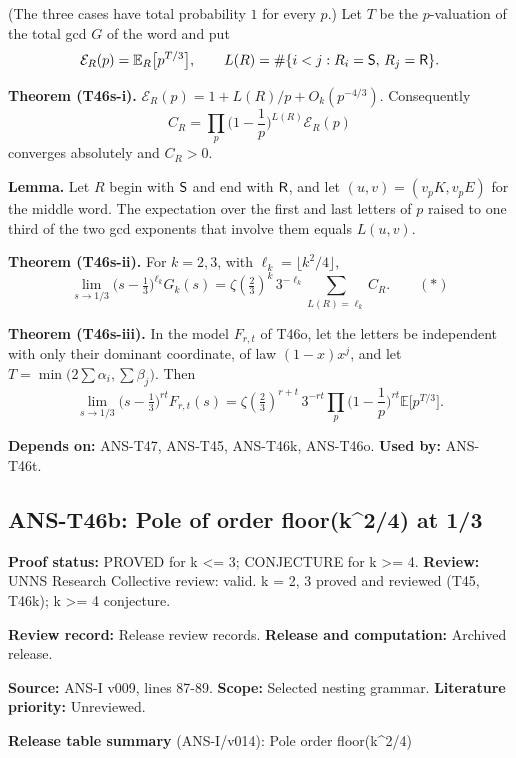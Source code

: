 \documentclass[
  11pt,
]{article}
\begin{document}
(The three cases have total probability \(1\) for every \(p\).) Let
\(T\) be the \(p\)-valuation of the total gcd \(G\) of the word and put
\[\mathcal E_R(p)=\mathbb E_R\big[p^{T/3}\big],\qquad L(R)=\#\{i<j:R_i={\sf S},\,R_j={\sf R}\}.\]

\textbf{Theorem (T46s-i).} \(\mathcal E_R(p)=1+L(R)/p+O_k(p^{-4/3})\).
Consequently \[C_R=\prod_p\Big(1-\frac1p\Big)^{L(R)}\mathcal E_R(p)\]
converges absolutely and \(C_R>0\).

\textbf{Lemma.} Let \(R\) begin with \({\sf S}\) and end with
\({\sf R}\), and let \((u,v)=(v_pK,v_pE)\) for the middle word. The
expectation over the first and last letters of \(p\) raised to one third
of the two gcd exponents that involve them equals \(L(u,v)\).

\textbf{Theorem (T46s-ii).} For \(k=2,3\), with
\(\ell_k=\lfloor k^2/4\rfloor\),
\[\lim_{s\to1/3}\big(s-\tfrac13\big)^{\ell_k}G_k(s)=\zeta(\tfrac23)^k\,3^{-\ell_k}\sum_{L(R)=\ell_k}C_R.\qquad(\ast)\]

\textbf{Theorem (T46s-iii).} In the model \(F_{r,t}\) of T46o, let the
letters be independent with only their dominant coordinate, of law
\((1-x)x^j\), and let \(T=\min\big(2\sum\alpha_i,\sum\beta_j\big)\).
Then
\[\lim_{s\to1/3}\big(s-\tfrac13\big)^{rt}F_{r,t}(s)=\zeta(\tfrac23)^{r+t}\,3^{-rt}\prod_p\Big(1-\frac1p\Big)^{rt}\mathbb E\big[p^{T/3}\big].\]

\textbf{Depends on:} ANS-T47, ANS-T45, ANS-T46k, ANS-T46o. \textbf{Used
by:} ANS-T46t.

\hypertarget{ans-t46b-pole-of-order-floork24-at-13}{%
\subsection{ANS-T46b: Pole of order floor(k\^{}2/4) at
1/3}\label{ans-t46b-pole-of-order-floork24-at-13}}

\textbf{Proof status:} PROVED for k \textless= 3; CONJECTURE for k
\textgreater= 4. \textbf{Review:} UNNS Research Collective review:
valid. k = 2, 3 proved and reviewed (T45, T46k); k \textgreater= 4
conjecture.

\textbf{Review record:} Release review records. \textbf{Release and
computation:} Archived release.

\textbf{Source:} ANS-I v009, lines 87-89. \textbf{Scope:} Selected
nesting grammar. \textbf{Literature priority:} Unreviewed.

\textbf{Release table summary} (ANS-I/v014): Pole order floor(k\^{}2/4)
\end{document}
